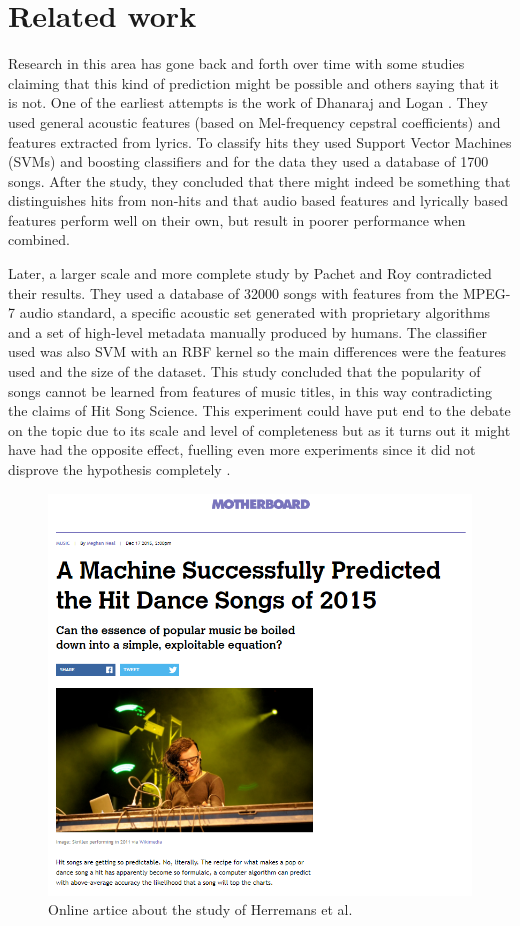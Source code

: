 \section{Related work}
\label{sec:relatedwork}
Research in this area has gone back and forth over time with some studies claiming that this kind of prediction might be possible and others saying that it is not. One of the earliest attempts is the work of Dhanaraj and Logan \cite{dhanaraj2005automatic}. They used general acoustic features (based on Mel-frequency cepstral coefficients) and features extracted from lyrics. To classify hits they used Support Vector Machines (SVMs) and boosting classifiers and for the data they used a database of 1700 songs. After the study, they concluded that there might indeed be something that distinguishes hits from non-hits and that audio based features and lyrically based features perform well on their own, but result in poorer performance when combined. 

Later, a larger scale and more complete study by Pachet and Roy \cite{pachet2008hit} contradicted their results. They used a database of 32000 songs with features from the MPEG-7 audio standard, a specific acoustic set generated with proprietary algorithms and a set of high-level metadata manually produced by humans. The classifier used was also SVM with an RBF kernel so the main differences were the features used and the size of the dataset. This study concluded that the popularity of songs cannot be learned from features of music titles, in this way contradicting the claims of Hit Song Science. This experiment could have put end to the debate on the topic due to its scale and level of completeness but as it turns out it might have had the opposite effect, fuelling even more experiments since it did not disprove the hypothesis completely \cite{li_music_2011}.

\begin{figure}[h]
\centering
\includegraphics[width=0.50\linewidth]{background/fig/art2.PNG}
\caption{Online artice about the study of Herremans et al. \cite{herremans2014dance} \cite{MachineArticle:online}}
\label{fig:hitarticle}
\end{figure}

